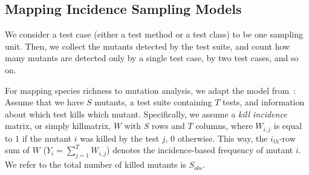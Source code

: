 \documentclass[sigconf,review,anonymous]{acmart}
\begin{document}


\subsection{Mapping Incidence Sampling Models}
\label{ssec:mapincidence}

We consider a test case (either a test method or a test class) to be one sampling unit. 
%
Then, we collect the mutants detected by the test suite, and count how many mutants
are detected only by a single test case,%
by two test cases, and so on.

For mapping species richness to mutation analysis, we adapt the model from~\cite{chao2016species}:
%
Assume that we have $S$ mutants, a test suite containing $T$ tests, and
information about which test kills which mutant.
Specifically, we assume a \emph{kill incidence} matrix, or simply killmatrix,
$W$ with $S$ rows and $T$ columns,
where $W_{i,j}$ is equal to $1$ if the mutant $i$ was killed by the test $j$, $0$ otherwise.
%
This way, the $i_{th}$-row sum of $W$ %
($Y_i=\sum_{j=1}^{T}W_{i,j}$) %
denotes the incidence-based frequency of mutant $i$.
We refer to the total number of killed mutants is $S_{obs}$.
%
\end{document}
